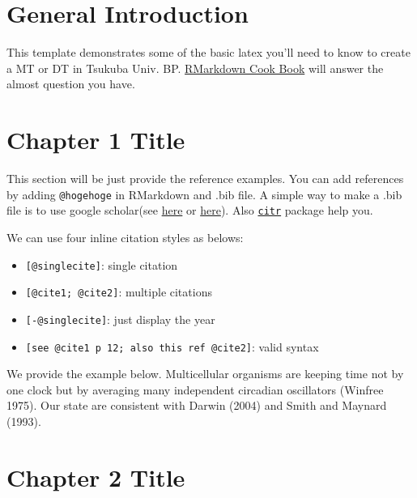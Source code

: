 \documentclass[12pt, a4paper]{report} %
\providecommand{\tightlist}{%
  \setlength{\itemsep}{0pt}\setlength{\parskip}{0pt}}
\begin{document}
\newpage
{} %

\tableofcontents
{}
\newpage
\listoftables
{}
\newpage
\listoffigures
{}
\newpage

\chapter*{General Introduction}
 \parindent=5.3mm

This template demonstrates some of the basic latex you'll need to know
to create a MT or DT in Tsukuba Univ. BP.
\href{https://bookdown.org/yihui/rmarkdown-cookbook/}{RMarkdown Cook
Book} will answer the almost question you have.

\chapter{Chapter 1 Title}
\label{Chap1}

This section will be just provide the reference examples. You can add
references by adding \texttt{@hogehoge} in RMarkdown and .bib file. A
simple way to make a .bib file is to use google scholar(see
\href{https://digitalmeasures.oregonstate.edu/training/export-bibtex-google-scholar}{here}
or
\href{http://ajdkbsuvi.blogspot.com/2011/02/google-scholarbibtex.html}{here}).
Also \href{https://github.com/crsh/citr}{\texttt{citr}} package help
you.

We can use four inline citation styles as belows:

\begin{itemize}
\tightlist
\item
  \texttt{{[}@singlecite{]}}: single citation
\item
  \texttt{{[}@cite1;\ @cite2{]}}: multiple citations
\item
  \texttt{{[}-@singlecite{]}}: just display the year
\item
  \texttt{{[}see\ @cite1\ p\ 12;\ also\ this\ ref\ @cite2{]}}: valid
  syntax
\end{itemize}

We provide the example below. Multicellular organisms are keeping time
not by one clock but by averaging many independent circadian oscillators
(Winfree 1975). Our state are consistent with Darwin (2004) and Smith
and Maynard (1993).

\chapter{Chapter 2 Title}
\label{Chap2}
\end{document}
